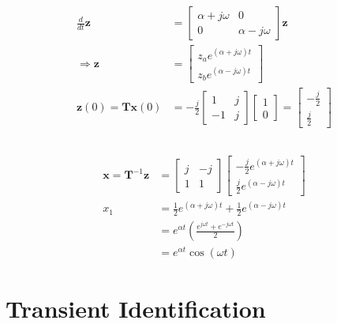 \documentclass[]{article}
\newcommand{\diff}[1]{\frac{d}{d #1}}
\begin{document}
\subsection{}

\begin{align}
	\diff{t} \bm{z} &= \begin{bmatrix}
	\alpha + j\omega & 0 \\
	0 & \alpha - j\omega
	\end{bmatrix} \bm{z} \\
	\Rightarrow \bm{z} &= \begin{bmatrix}
	z_a e^{(\alpha + j\omega)t} \\
	z_b e^{(\alpha - j\omega)t}
	\end{bmatrix} \\
	\bm{z}(0) = \bm{T}\bm{x}(0) &= -\frac{j}{2} \begin{bmatrix}
	1 & j \\
	-1 & j
	\end{bmatrix}
	\begin{bmatrix}
	1 \\
	0
	\end{bmatrix} = \begin{bmatrix}
		-\frac{j}{2} \\
		\frac{j}{2}
	\end{bmatrix}
\end{align}

\subsection{}

\begin{align}
	\bm{x} = \bm{T}^{-1} \bm{z} &= \begin{bmatrix}
	j & -j \\
	1 & 1
	\end{bmatrix}
	\begin{bmatrix}
	-\frac{j}{2} e^{(\alpha + j\omega)t} \\
	\frac{j}{2} e^{(\alpha - j\omega)t}
	\end{bmatrix} \\
	x_1 &= \frac{1}{2} e^{(\alpha + j\omega)t} + \frac{1}{2} e^{(\alpha - j\omega)t} \\
	&= e^{\alpha t} \left(\frac{e^{j \omega t} + e^{-j \omega t}}{2}\right) \\
	&= e^{\alpha t} \cos(\omega t)
\end{align}

\section{Transient Identification}
\end{document}
